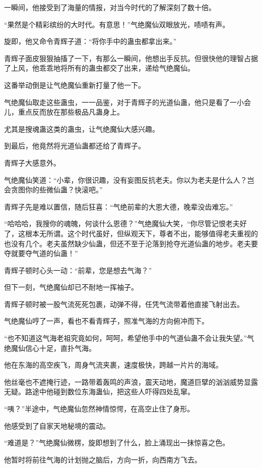 \begin{this_body}
一瞬间，他接受到了海量的情报，对当今时代的了解深刻了数十倍。

“果然是个精彩缤纷的大时代。有意思！”气绝魔仙双眼放光，啧啧有声。

旋即，他又命令青辉子道：“将你手中的蛊虫都拿出来。”

青辉子面皮狠狠抽搐了一下，有那么一瞬间，他想出手反抗。但很快他的理智占据了上风，他乖乖地将所有的蛊虫都交了出来，递给气绝魔仙。

这番举动倒是让气绝魔仙重新打量了他一下。

气绝魔仙取走这些蛊虫，一一品鉴，对于青辉子的光道仙蛊，他只是看了一小会儿，重点反而放在那些极品凡蛊身上。

尤其是搜魂蛊这类的蛊虫，让气绝魔仙大感兴趣。

到最后，他竟然将光道仙蛊都还给了青辉子。

青辉子大感意外。

气绝魔仙笑道：“小辈，你很识趣，没有妄图反抗老夫。你以为老夫是什么人？岂会贪图你的些微仙蛊？快滚吧。”

青辉子先是难以置信，随后狂喜：“气绝前辈的大恩大德，晚辈没齿难忘。”

“哈哈哈，我搜你的魂魄，何谈什么恩德？”气绝魔仙大笑，“你尽管记恨老夫好了，这根本无所谓。这个时代虽好，但纵观天下，尊者不出，能够值得老夫重视的也没有几个。老夫虽然缺少仙蛊，但还不至于沦落到抢夺光道仙蛊的地步。老夫要夺就要夺气道的仙蛊！”

青辉子顿时心头一动：“前辈，您是想去气海？”

但下一刻，气绝魔仙却已不耐地一挥袖子。

青辉子顿时被一股气流死死包裹，动弹不得，任凭气流带着他直接飞射出去。

气绝魔仙哼了一声，看也不看青辉子，照准气海的方向俯冲而下。

“也不知道这气海老祖究竟如何，呵呵，希望他手中的气道仙蛊不会让我失望。”气绝魔仙信心十足，直扑气海。

他在东海的高空疾飞，周身气流夹裹，速度极快，跨越一片片的海域。

他丝毫也不遮掩行迹，一路带着轰鸣的声浪，震天动地，魔道巨擘的汹汹威势显露无疑。路途中他碰到数位东海蛊仙，把这些人吓得四处乱窜。

“咦？”半途中，气绝魔仙忽然神情惊愕，在高空止住了身形。

他感受到了自家天地秘境的震动。

“难道是？”气绝魔仙微楞，旋即想到了什么，脸上涌现出一抹惊喜之色。

他暂时将前往气海的计划抛之脑后，方向一折，向西南方飞去。


\end{this_body}
